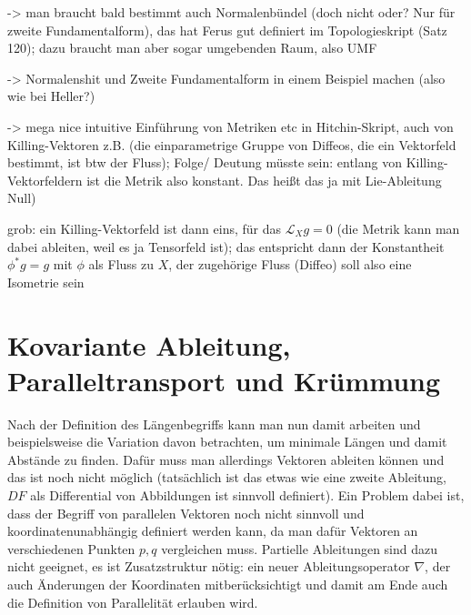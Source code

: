 \documentclass[../H_Analysis_main.tex]{subfiles}
\begin{document}
-> man braucht bald bestimmt auch Normalenbündel (doch nicht oder? Nur für zweite Fundamentalform), das hat Ferus gut definiert im Topologieskript (Satz 120); dazu braucht man aber sogar umgebenden Raum, also UMF

-> Normalenshit und Zweite Fundamentalform in einem Beispiel machen (also wie bei Heller?)


-> mega nice intuitive Einführung von Metriken etc in Hitchin-Skript, auch von Killing-Vektoren z.B. (die einparametrige Gruppe von Diffeos, die ein Vektorfeld bestimmt, ist btw der Fluss); Folge/ Deutung müsste sein: entlang von Killing-Vektorfeldern ist die Metrik also konstant. Das heißt das ja mit Lie-Ableitung Null)


grob: ein Killing-Vektorfeld ist dann eins, für das $\mathcal{L}_X g = 0$ (die Metrik kann man dabei ableiten, weil es ja Tensorfeld ist); das entspricht dann der Konstantheit $\phi^* g = g$ mit $\phi$ als Fluss zu $X$, der zugehörige Fluss (Diffeo) soll also eine Isometrie sein


\newpage


	\section{Kovariante Ableitung, Paralleltransport und Krümmung}
Nach der Definition des Längenbegriffs kann man nun damit arbeiten und beispielsweise die Variation davon betrachten, um minimale Längen und damit Abstände zu finden. Dafür muss man allerdings Vektoren ableiten können und das ist noch nicht möglich (tatsächlich ist das etwas wie eine zweite Ableitung, $DF$ als Differential von Abbildungen ist sinnvoll definiert). Ein Problem dabei ist, dass der Begriff von parallelen Vektoren noch nicht sinnvoll und koordinatenunabhängig definiert werden kann, da man dafür Vektoren an verschiedenen Punkten $p, q$ vergleichen muss. %
Partielle Ableitungen sind dazu nicht geeignet, es ist Zusatzstruktur nötig: ein neuer Ableitungsoperator $\nabla$, der auch Änderungen der Koordinaten mitberücksichtigt und damit am Ende auch die Definition von Parallelität erlauben wird.

\end{document}
